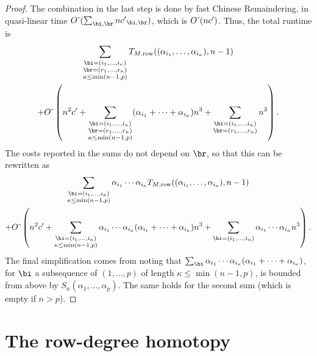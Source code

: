 \documentclass[12pt]{article}
\begin{document}
\begin{proof}
  The combination in the last step is done by fast Chinese Remaindering,
  in quasi-linear time $\softO(\sum_{\bi,\br} n \rc_{\bi,\br})$,
  which is ${O}{\,\tilde{ }\,}(n {c'}{})$. Thus, the total runtime is 
  \begin{multline*}
 \sum_{\substack{\bi=(i_1,\dots,i_\kappa)\\ \br=(r_1,\dots,r_\kappa)\\\kappa\le\min(n-1,p)}}
T_{M,{\rm row}}((\alpha_{i_1},\dots,\alpha_{i_\kappa}), n-1)\\
+\softO\left (n^2 \rc + \sum_{\substack{\bi=(i_1,\dots,i_\kappa)\\ \br=(r_1,\dots,r_\kappa)\\\kappa\le\min(n-1,p)}}
  (\alpha_{i_1} + \cdots +\alpha_{i_\kappa}) n^3 
  +  \sum_{\substack{\bi=(i_1,\dots,i_n)\\ \br=(r_1,\dots,r_n)}} n^3\right).    
  \end{multline*}
  The costs reported in the sums do not depend on $\br$, so that 
  this can be rewritten as 
  \begin{multline*}
 \sum_{\substack{\bi=(i_1,\dots,i_\kappa)\\ \kappa\le\min(n-1,p)}}
  \alpha_{i_1}  \cdots \alpha_{i_\kappa}T_{M,{\rm row}}((\alpha_{i_1},\dots,\alpha_{i_\kappa}), n-1)\\
+\softO\left (n^2 \rc + \sum_{\substack{\bi=(i_1,\dots,i_\kappa)\\ \kappa\le\min(n-1,p)}}
    \alpha_{i_1}  \cdots \alpha_{i_\kappa} (\alpha_{i_1} + \cdots +\alpha_{i_\kappa}) n^3 
  +  \sum_{\substack{\bi=(i_1,\dots,i_n)}   }\alpha_{i_1}  \cdots \alpha_{i_n} n^3\right).    
  \end{multline*}
  The final simplification comes from noting that $\sum_{\bi}
  \alpha_{i_1} \cdots \alpha_{i_\kappa}(\alpha_{i_1} + \cdots
  +\alpha_{i_\kappa})$, for $\bi$ a subsequence of $(1,\dots,p)$ of
  length $\kappa\le\min(n-1,p)$, is bounded from above by
  $S_n(\alpha_1,\dots,\alpha_p)$. The same holds for the second
  sum (which is empty if $n >p$).
\end{proof}


\section{The row-degree homotopy}\label{sec:rowdegree}
\end{document}
